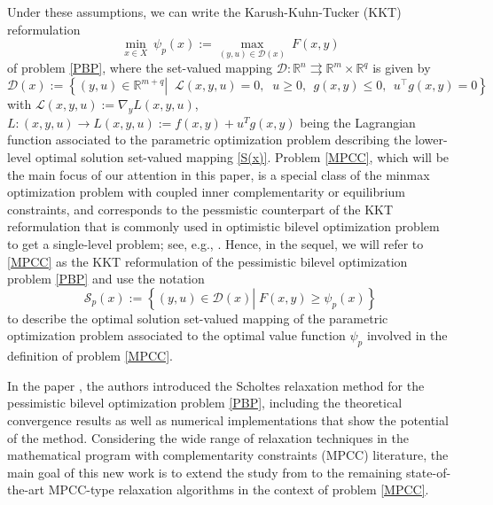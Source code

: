 Under these assumptions, we can write the Karush-Kuhn-Tucker (KKT) reformulation
\begin{equation}\tag{KKT}\label{MPCC}
    \underset{x\in X}\min~\psi_{p}(x):=\underset{(y, u)\in \mathcal{D}(x)}\max~F(x,y)
\end{equation}
of problem \eqref{PBP}, where the set-valued mapping $\mathcal{D} :\mathbb{R}^{n} \rightrightarrows \mathbb{R}^{m}\times\mathbb{R}^{q}$ is given by
\begin{equation}\label{KKT system}
\mathcal{D}(x) := \left\{\left. (y, u)\in \mathbb{R}^{m+q} \right|\;\; \mathcal{L}(x,y,u)=0, \;\; u\geq 0, \;\, g(x,y)\leq0, \;\, u^\top g(x, y)=0\right\}
\end{equation}
with $\mathcal{L}(x,y,u):=\nabla_{y}L(x,y,u)$, $L:(x,y,u)\rightarrow L(x,y,u):=f(x,y)+u^{T}g(x,y)$ being the Lagrangian function associated to the parametric optimization problem describing the lower-level optimal solution set-valued mapping  \eqref{S(x)}.
Problem \eqref{MPCC}, which will be the main focus of our attention in this paper, is a special class of the minmax optimization problem with coupled inner complementarity or equilibrium constraints, and corresponds to the pessmistic counterpart of the KKT reformulation that is commonly used in optimistic bilevel optimization problem to get a single-level problem; see, e.g., \cite{Au,DempeDutta2012,DempeZemkohoKKTRefNonsmooth,DempeZemkohoKKTRef}.  Hence, in the sequel, we will refer to \eqref{MPCC} as the KKT reformulation of the pessimistic bilevel optimization problem \eqref{PBP} and use the notation
\[
\mathcal{S}_{p}(x):=\left\{  (y,u)\in\mathcal{D}(x)\left\vert \;F(x,y)\geq
\psi_{p}(x)\right.  \right\} \]
to describe the optimal solution set-valued mapping of the parametric optimization problem associated to the optimal value function $\psi_p$ involved in the definition of problem  \eqref{MPCC}.

In the paper \cite{BNZ}, the authors introduced the Scholtes relaxation method for the pessimistic bilevel optimization problem \eqref{PBP}, including the theoretical convergence results as well as numerical implementations that show the potential of the method. Considering the wide range of relaxation techniques in the mathematical program with complementarity constraints (MPCC) literature, the main goal of this new work is to extend the study from \cite{BNZ} to the remaining state-of-the-art MPCC-type relaxation algorithms in the context of problem  \eqref{MPCC}. %

